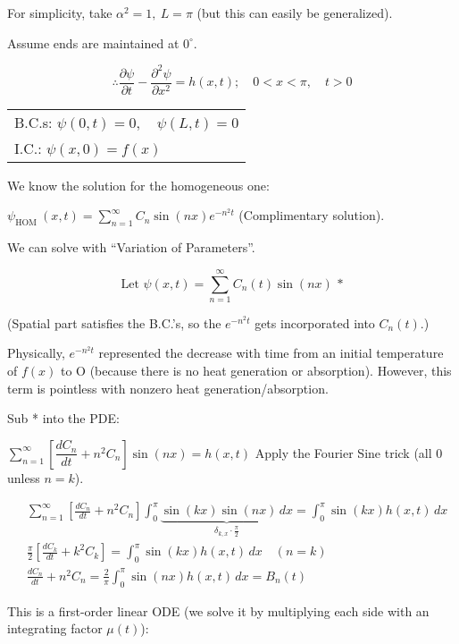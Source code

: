 \documentclass{report}
\begin{document}
For simplicity, take $\alpha^{2}=1,\ L=\pi$ (but this can easily be generalized).

Assume ends are maintained at $0^{\circ}$.

$$\therefore \dfrac{\partial \psi}{\partial t}-\dfrac{\partial^{2} \psi}{\partial x^{2}}=h(x, t);\quad 0<x<\pi,\quad t>0$$

\begin{flushleft}
\begin{tabular}{@{}l@{}}
B.C.s: $\psi(0,t)=0,\quad \psi(L,t)=0$\\[1ex]
I.C.: $\psi(x,0)=f(x)$
\end{tabular}
\end{flushleft}


We know the solution for the homogeneous one:

$\psi_{\text {HOM }}(x, t)=\sum\limits_{n=1}^{\infty} C_{n} \sin (n x) e^{-n^{2} t}$ \quad (Complimentary solution).

We can solve with ``Variation of Parameters''.

$$
\text{Let } \boxed{\psi(x, t)=\sum_{n=1}^{\infty} C_{n}(t) \sin (n x)} \text{ *}
$$

(Spatial part satisfies the B.C.'s, so the $e^{-n^{2} t}$ gets incorporated into $C_{n}(t)$.)

Physically, $e^{-n^{2} t}$ represented the decrease with time from an initial temperature of $f(x)$ to O (because there is no heat generation or absorption). However, this term is pointless with nonzero heat generation/absorption.

Sub * into the PDE:

$\sum\limits_{n=1}^{\infty}\left[\dfrac{d C_{n}}{d t}+n^{2} C_{n}\right] \sin (n x)=h(x, t)$ \quad Apply the Fourier Sine trick (all 0 unless $n=k$).

$$
\begin{aligned}
& \sum_{n=1}^{\infty}\left[\frac{d C_{n}}{d t}+n^{2} C_{n}\right] \int_{0}^{\pi} \underbrace{\sin(k x) \sin(n x)\, dx}_{\delta_{k,x}\cdot \frac{\pi}{2}} = \int_{0}^{\pi} \sin(k x) h(x,t)\, dx \\
& \frac{\pi}{2}\left[\frac{d C_{k}}{d t}+k^{2} C_{k}\right]= \int_{0}^{\pi} \sin(k x) h(x,t)\, dx \quad (n=k) \\
& \frac{d C_{n}}{d t}+n^{2} C_{n} = \frac{2}{\pi} \int_{0}^{\pi} \sin(n x) h(x,t)\, dx = B_{n}(t)
\end{aligned}
$$

This is a first-order linear ODE (we solve it by multiplying each side with an integrating factor $\mu(t)$):
\end{document}
